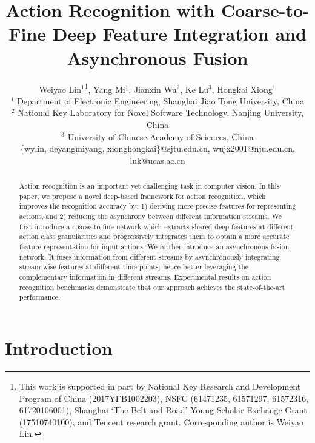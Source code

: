 \documentclass[letterpaper]{article} %
\begin{document}
%
\title{Action Recognition with Coarse-to-Fine Deep Feature Integration and Asynchronous Fusion}
\author{Weiyao Lin$^1$\thanks{This work is supported in part by National Key Research and Development Program of China (2017YFB1002203), NSFC (61471235, 61571297, 61572316, 61720106001), Shanghai `The Belt and Road' Young Scholar Exchange Grant (17510740100), and Tencent research grant. Corresponding author is Weiyao Lin.}, Yang Mi$^1$, Jianxin Wu$^2$, Ke Lu$^3$, Hongkai Xiong$^1$\\
 $^1$ Department of Electronic Engineering, Shanghai Jiao Tong University, China\\
 $^2$ National Key Laboratory for Novel Software Technology, Nanjing University, China \\
 $^3$ University of Chinese Academy of Sciences, China \\
 \{wylin, deyangmiyang, xionghongkai\}@sjtu.edu.cn, wujx2001@nju.edu.cn, luk@ucas.ac.cn
 }

\maketitle

\begin{abstract}
  Action recognition is an important yet challenging task in computer vision. In this paper, we propose a novel deep-based framework for action recognition, which improves the recognition accuracy by: 1) deriving more precise features for representing actions, and 2) reducing the asynchrony between different information streams. We first introduce a coarse-to-fine network which extracts shared deep features at different action class granularities and progressively integrates them to obtain a more accurate feature representation for input actions. We further introduce an asynchronous fusion network. It fuses information from different streams by asynchronously integrating stream-wise features at different time points, hence better leveraging the complementary information in different streams. Experimental results on action recognition benchmarks demonstrate that our approach achieves the state-of-the-art performance.
\end{abstract}

\section{Introduction\label{section:introduction}}
\end{document}
